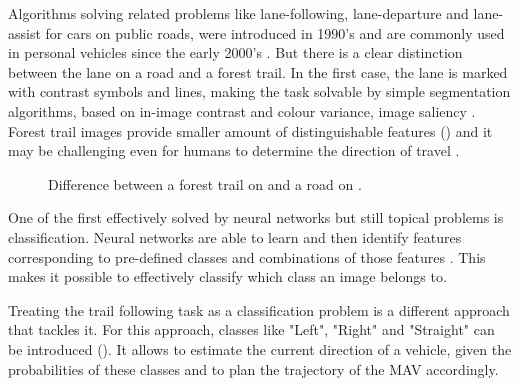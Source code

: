 Algorithms solving related problems like lane-following, lane-departure and lane-assist for cars on public roads, were introduced in 1990's \cite{batavia1999driver} and are commonly used in personal vehicles since the early 2000's \cite{chen2020lane}. But there is a clear distinction between the lane on a road and a forest trail. In the first case, the lane is marked with contrast symbols and lines, making the task solvable by simple segmentation algorithms, based on in-image contrast and colour variance, image saliency \cite{santana2013tracking}. Forest trail images provide smaller amount of distinguishable features () and it may be challenging even for humans to determine the direction of travel \cite{giusti2016machine}.

\begin{figure}[H]
  \centering
  \caption{Difference between a forest trail on  and a road on .}
  \label{fig:features_difference}
\end{figure}

One of the first effectively solved by neural networks but still topical problems is classification. Neural networks are able to learn and then identify features corresponding to pre-defined classes and combinations of those features \cite{krizhevsky2012imagenet}. This makes it possible to effectively classify which class an image belongs to. 

Treating the trail following task as a classification problem is a different approach that tackles it. For this approach, classes like "Left", "Right" and "Straight" can be introduced \cite{giusti2016machine} (). It allows to estimate the current direction of a vehicle, given the probabilities of these classes and to plan the trajectory of the \acs{MAV} accordingly. 


